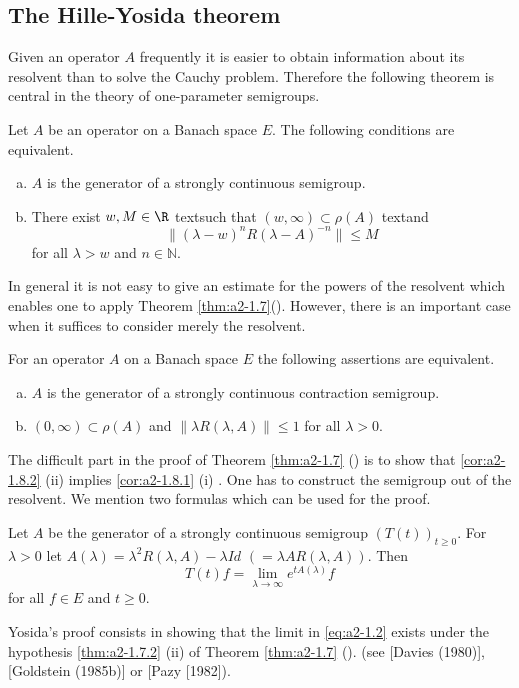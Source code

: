 \subsection{The Hille-Yosida theorem} \label{subsec:a2-1.se3}
Given an operator $A$ frequently it is easier to obtain information about its resolvent than to solve the Cauchy problem.
Therefore the following theorem is central in the theory of one-parameter semigroups.
\begin{theorem}\label{thm:a2-1.7}
Let $A$ be an operator on a Banach space $E$.
The following conditions are equivalent.
\begin{enumerate}[(a)]
\item \label{thm:a2-1.7.1}
$A$ is the generator of a strongly continuous semigroup.
\item \label{thm:a2-1.7.2}
There exist $w, M \in \R$ text{such that} $(w,\infty) \subset \rho(A)$ text{and} 
\[
    \| {(\lambda - w)^{n}} R(\lambda-A)^{-n}\| \leq M 
\]
for all $\lambda > w$ and $n \in \mathbb{N}$.
\end{enumerate}
\end{theorem}
In general it is not easy to give an estimate for the powers of the resolvent which enables one to apply Theorem \ref{thm:a2-1.7}().
However, there is an important case when it suffices to consider merely the resolvent.
\begin{corollary}\label{cor:a2-1.8}
For an operator $A$ on a Banach space $E$ the following assertions are equivalent.
\begin{enumerate}[(a)]
\item \label{cor:a2-1.8.1}
$A$ is the generator of a strongly continuous contraction semigroup.
\item \label{cor:a2-1.8.2}
$(0,\infty) \subset \rho(A)$ and $\|\lambda R(\lambda,A)\| \leq 1$ for all $\lambda > 0$.
\end{enumerate}
\end{corollary}
The difficult part in the proof of Theorem \ref{thm:a2-1.7} () is to show that \ref{cor:a2-1.8.2} (\lnm ii) implies \ref{cor:a2-1.8.1} (\lnm i) .
One has to construct the semigroup out of the resolvent.
We mention two formulas which can be used for the proof.
\begin{proposition}\label{prop:a2-1.9}
Let $A$ be the generator of a strongly continuous semigroup
$(T(t))_{t \geq 0}$.
For $\lambda > 0$ let $A(\lambda) = \lambda^{2}R(\lambda,A)-\lambda Id$ $(=\lambda A R(\lambda,A))$.
Then
\begin{equation}\label{eq:a2-1.2}
    T(t)f = \lim_{\lambda \to \infty} e^{tA(\lambda)}f
\end{equation}
for all $f \in E$ and $t \geq 0$.
\end{proposition}
Yosida's proof consists in showing that the limit in \eqref{eq:a2-1.2} exists under the hypothesis  \ref{thm:a2-1.7.2} 
(\lnm ii) of Theorem  \ref{thm:a2-1.7} (). (see [Davies (1980)], [Goldstein (1985b)] or [Pazy [1982]).


